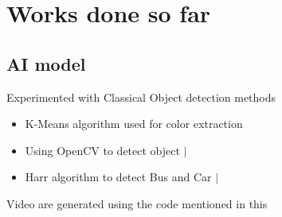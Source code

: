 \documentclass{beamer}
\newcommand{\link}[2]{\href{#1}{\textit{\color{blue}{#2}}}}%
\begin{document}
	\section{Works done so far}
	\subsection{AI model}
	\begin{frame}{Experimented with Classical Object detection methods}
		\begin{itemize}
			\item K-Means algorithm used for color extraction
				\link{https://github.com/Project-Dragon-Fly/tutorial-trials/blob/tutorial\_testing/Color\%20detection.ipynb}{notebook}
			
			\item Using OpenCV to detect object  
				\link{https://github.com/Project-Dragon-Fly/tutorial-trials/blob/tutorial\_testing/OpenCV-image-difference.ipynb}{notebook} $|$ 
				\link{https://drive.google.com/file/d/1-2EAoUBxMzfnMO3tVJFJ0qvGnXMFp4zL/view}{video}
			
			\item Harr algorithm to detect Bus and Car
				\link{https://github.com/Project-Dragon-Fly/tutorial-trials/blob/tutorial\_testing/OpenCV\%20-\%20Haar\%20algo.ipynb}{notebook} $|$
				\link{https://drive.google.com/file/d/1XYbVf6I2ZJSSdO2SsZECK9rNoYQwROM9/view}{video}
		\end{itemize}
		\begin{small}
			Video are generated using the code mentioned in this \link{https://github.com/Project-Dragon-Fly/tutorial-trials/blob/tutorial\_testing/Detection\_video\_generator.ipynb}{notebook}
		\end{small}
	\end{frame}
\end{document}
